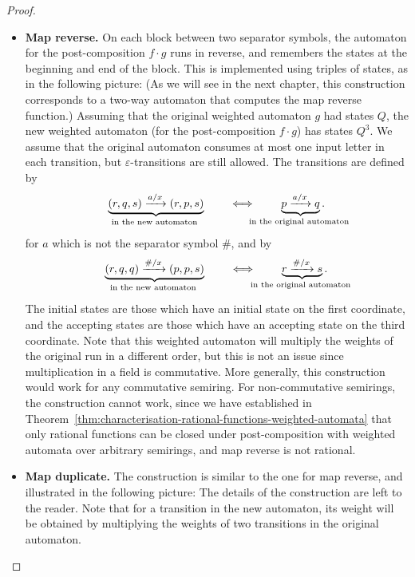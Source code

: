 \begin{proof}
    \begin{itemize}
        \item \textbf{Map reverse.}
        On each block between two separator symbols, the automaton for the post-composition $f \cdot g$ runs in reverse, and remembers the states at the beginning and end of the block.  This is implemented using triples of states, as in the following picture: 
        (As we will see in the next chapter, this construction corresponds to a two-way automaton that computes the map reverse function.)
        Assuming that the original weighted automaton $g$ had states $Q$, the new weighted automaton (for the post-composition $f \cdot g$) has states $Q^3$. We assume that the original automaton consumes at most one input letter in each transition, but $\varepsilon$-transitions are still allowed.  The transitions are defined by   
        \begin{align*}
            \myunderbrace
            {      (r,q,s) \xrightarrow{a / x } (r,p,s) }{in the new automaton}
            \qquad \iff \qquad 
            \myunderbrace
            {      p \xrightarrow{a / x } q }{in the original automaton}.
        \end{align*}
        for $a$ which is not the separator symbol $\#$, and by
               \begin{align*}
            \myunderbrace
            {      (r,q,q) \xrightarrow{\# / x } (p,p,s) }{in the new automaton}
            \qquad \iff \qquad 
            \myunderbrace
            {      r \xrightarrow{\# / x } s }{in the original automaton}.
        \end{align*}
        The initial states are those which have an initial state on the first coordinate, and the accepting states are those which have an accepting state on the third coordinate. Note that this weighted automaton will multiply the weights of the original run in a different order, but this is not an issue since multiplication in a field is commutative. More generally, this construction would work for any commutative semiring. For non-commutative semirings, the construction cannot work, since we have established in Theorem~\ref{thm:characterisation-rational-functions-weighted-automata} that only rational functions can be closed under post-composition with  weighted automata over arbitrary semirings, and map reverse is not rational.

        \item \textbf{Map duplicate.}
        The construction is similar to the one for map reverse, and illustrated in the following picture:
        The details of the construction are left to the reader. Note that for a transition in the new automaton, its weight will be obtained by multiplying the weights of two transitions in the original automaton. 
    \end{itemize}
\end{proof}

